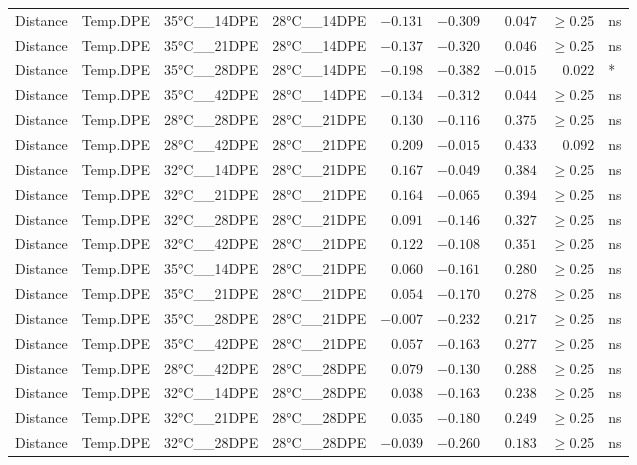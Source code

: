 \documentclass[
]{article}
\begin{document}
\begin{longtable}{llllrrrrl}
Distance & Temp.DPE & 35°C\_\_14DPE & 28°C\_\_14DPE & $-0.131$ & $-0.309$ & $0.047$ & $\geq$0.25 & ns \\ 
Distance & Temp.DPE & 35°C\_\_21DPE & 28°C\_\_14DPE & $-0.137$ & $-0.320$ & $0.046$ & $\geq$0.25 & ns \\ 
Distance & Temp.DPE & 35°C\_\_28DPE & 28°C\_\_14DPE & $-0.198$ & $-0.382$ & $-0.015$ & $0.022$ & * \\ 
Distance & Temp.DPE & 35°C\_\_42DPE & 28°C\_\_14DPE & $-0.134$ & $-0.312$ & $0.044$ & $\geq$0.25 & ns \\ 
Distance & Temp.DPE & 28°C\_\_28DPE & 28°C\_\_21DPE & $0.130$ & $-0.116$ & $0.375$ & $\geq$0.25 & ns \\ 
Distance & Temp.DPE & 28°C\_\_42DPE & 28°C\_\_21DPE & $0.209$ & $-0.015$ & $0.433$ & $0.092$ & ns \\ 
Distance & Temp.DPE & 32°C\_\_14DPE & 28°C\_\_21DPE & $0.167$ & $-0.049$ & $0.384$ & $\geq$0.25 & ns \\ 
Distance & Temp.DPE & 32°C\_\_21DPE & 28°C\_\_21DPE & $0.164$ & $-0.065$ & $0.394$ & $\geq$0.25 & ns \\ 
Distance & Temp.DPE & 32°C\_\_28DPE & 28°C\_\_21DPE & $0.091$ & $-0.146$ & $0.327$ & $\geq$0.25 & ns \\ 
Distance & Temp.DPE & 32°C\_\_42DPE & 28°C\_\_21DPE & $0.122$ & $-0.108$ & $0.351$ & $\geq$0.25 & ns \\ 
Distance & Temp.DPE & 35°C\_\_14DPE & 28°C\_\_21DPE & $0.060$ & $-0.161$ & $0.280$ & $\geq$0.25 & ns \\ 
Distance & Temp.DPE & 35°C\_\_21DPE & 28°C\_\_21DPE & $0.054$ & $-0.170$ & $0.278$ & $\geq$0.25 & ns \\ 
Distance & Temp.DPE & 35°C\_\_28DPE & 28°C\_\_21DPE & $-0.007$ & $-0.232$ & $0.217$ & $\geq$0.25 & ns \\ 
Distance & Temp.DPE & 35°C\_\_42DPE & 28°C\_\_21DPE & $0.057$ & $-0.163$ & $0.277$ & $\geq$0.25 & ns \\ 
Distance & Temp.DPE & 28°C\_\_42DPE & 28°C\_\_28DPE & $0.079$ & $-0.130$ & $0.288$ & $\geq$0.25 & ns \\ 
Distance & Temp.DPE & 32°C\_\_14DPE & 28°C\_\_28DPE & $0.038$ & $-0.163$ & $0.238$ & $\geq$0.25 & ns \\ 
Distance & Temp.DPE & 32°C\_\_21DPE & 28°C\_\_28DPE & $0.035$ & $-0.180$ & $0.249$ & $\geq$0.25 & ns \\ 
Distance & Temp.DPE & 32°C\_\_28DPE & 28°C\_\_28DPE & $-0.039$ & $-0.260$ & $0.183$ & $\geq$0.25 & ns \\ 

\end{longtable}
\end{document}
